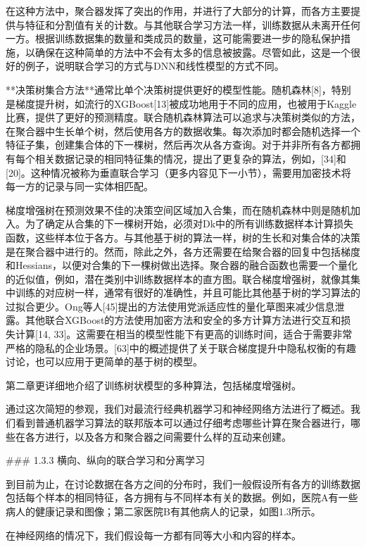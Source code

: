 在这种方法中，聚合器发挥了突出的作用，并进行了大部分的计算，而各方主要提供与特征和分割值有关的计数。与其他联合学习方法一样，训练数据从未离开任何一方。根据训练数据集的数量和类成员的数量，这可能需要进一步的隐私保护措施，以确保在这种简单的方法中不会有太多的信息被披露。尽管如此，这是一个很好的例子，说明联合学习的方式与DNN和线性模型的方式不同。

**决策树集合方法**通常比单个决策树提供更好的模型性能。随机森林[8]，特别是梯度提升树，如流行的XGBoost[13]被成功地用于不同的应用，也被用于Kaggle比赛，提供了更好的预测精度。联合随机森林算法可以追求与决策树类似的方法，在聚合器中生长单个树，然后使用各方的数据收集。每次添加时都会随机选择一个特征子集，创建集合体的下一棵树，然后再次从各方查询。对于并非所有各方都拥有每个相关数据记录的相同特征集的情况，提出了更复杂的算法，例如，[34]和[20]。这种情况被称为垂直联合学习（更多内容见下一小节），需要用加密技术将每一方的记录与同一实体相匹配。

梯度增强树在预测效果不佳的决策空间区域加入合集，而在随机森林中则是随机加入。为了确定从合集的下一棵树开始，必须对Dk中的所有训练数据样本计算损失函数，这些样本位于各方。与其他基于树的算法一样，树的生长和对集合体的决策是在聚合器中进行的。然而，除此之外，各方还需要在给聚合器的回复中包括梯度和Hessians，以便对合集的下一棵树做出选择。聚合器的融合函数也需要一个量化的近似值，例如，潜在类别中训练数据样本的直方图。联合梯度增强树，就像其集中训练的对应树一样，通常有很好的准确性，并且可能比其他基于树的学习算法的过拟合更少。Ong等人[45]提出的方法使用党派适应性的量化草图来减少信息泄露。其他联合XGBoost的方法使用加密方法和安全的多方计算方法进行交互和损失计算[14, 33]。这需要在相当的模型性能下有更高的训练时间，适合于需要非常严格的隐私的企业场景。[63]中的概述提供了关于联合梯度提升中隐私权衡的有趣讨论，也可以应用于更简单的基于树的模型。

第二章更详细地介绍了训练树状模型的多种算法，包括梯度增强树。

通过这次简短的参观，我们对最流行经典机器学习和神经网络方法进行了概述。我们看到普通机器学习算法的联邦版本可以通过仔细考虑哪些计算在聚合器进行，哪些在各方进行，以及各方和聚合器之间需要什么样的互动来创建。

### 1.3.3 横向、纵向的联合学习和分离学习

到目前为止，在讨论数据在各方之间的分布时，我们一般假设所有各方的训练数据包括每个样本的相同特征，各方拥有与不同样本有关的数据。例如，医院A有一些病人的健康记录和图像；第二家医院B有其他病人的记录，如图1.3所示。

在神经网络的情况下，我们假设每一方都有同等大小和内容的样本。

